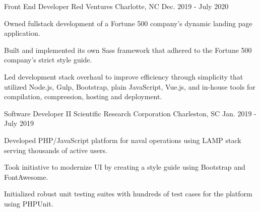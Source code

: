 \begin{cventries}
  \cventry
    {Front End Developer} %
    {Red Ventures} %
    {Charlotte, NC} %
    {Dec. 2019 - July 2020} %
    {
      \begin{cvitems} %
        \item {Owned fullstack development of a Fortune 500 company's dynamic landing page application.}
        \item {Built and implemented its own Sass framework that adhered to the Fortune 500 company's strict style guide.}
        \item {Led development stack overhaul to improve efficiency through simplicity that utilized Node.js, Gulp, Bootstrap, plain JavaScript, Vue.js, and in-house tools for compilation, compression, hosting and deployment.}
      \end{cvitems}
    }

  \cventry
    {Software Developer II} %
    {Scientific Research Corporation} %
    {Charleston, SC} %
    {Jan. 2019 - July 2019} %
    {
      \begin{cvitems} %
        \item {Developed PHP/JavaScript platform for naval operations using LAMP stack serving thousands of active users.}
        \item {Took initiative to modernize UI by creating a style guide using Bootstrap and FontAwesome.}
        \item {Initialized robust unit testing suites with hundreds of test cases for the platform using PHPUnit.}
      \end{cvitems}
    }


\end{cventries}
